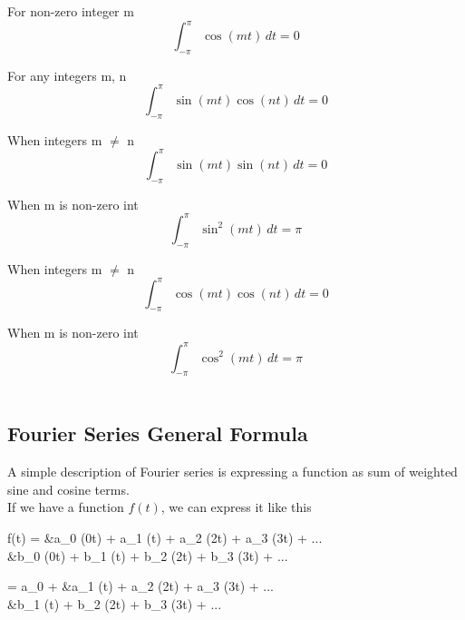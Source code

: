 \documentclass[12pt, a4paper]{article}
\numberwithin{equation}{section}
\begin{document}
		For non-zero integer m
		\begin{equation}
			\int_{-\pi}^{\pi}\cos(mt)\,dt = 0
			\label{eq_def_integral_cos}
		\end{equation}
	
		For any integers m, n
		\begin{equation}
			\int_{-\pi}^{\pi}\sin(mt)\cos(nt)\,dt = 0
			\label{eq_def_integral_sin_cos}
		\end{equation}
	
		When integers m $\neq$ n
		\begin{equation}
			\int_{-\pi}^{\pi}\sin(mt)\sin(nt)\,dt = 0
			\label{eq_def_integral_sin_sin}
		\end{equation}
	
		When m is non-zero int
		\begin{equation}
			\int_{-\pi}^{\pi}\sin^2(mt)\,dt = \pi
			\label{eq_def_integral_sin^2}
		\end{equation}
	
		When integers m $\neq$ n
		\begin{equation}
			\int_{-\pi}^{\pi}\cos(mt)\cos(nt)\,dt = 0
			\label{eq_def_integral_cos_cos}
		\end{equation}
		
		When m is non-zero int
		\begin{equation}
			\int_{-\pi}^{\pi}\cos^2(mt)\,dt = \pi
			\label{eq_def_integral_cos^2}
		\end{equation}\\
		

		\subsection{Fourier Series General Formula}
		A simple description of Fourier series is expressing a function as sum of weighted sine and cosine terms.\\
		
		If we have a function $f(t)$, we can express it like this 
		\begin{flalign}\nonumber
			f(t) = &a_0 \cos(0t) + a_1 \cos(t) + a_2 \cos(2t)  + a_3 \cos(3t) + ...\\ \nonumber
			&b_0 \sin(0t) + b_1 \sin(t) + b_2 \sin(2t) + b_3 \sin(3t) + ...
		\end{flalign}
		\begin{flalign}\nonumber
			= a_0 + &a_1 \cos(t) + a_2 \cos(2t)  + a_3 \cos(3t) + ...\\ \nonumber
			&b_1 \sin(t) + b_2 \sin(2t) + b_3 \sin(3t) + ...
		\end{flalign}\\
		
\end{document}
